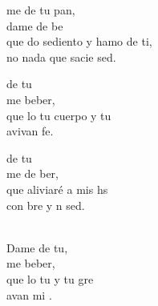 \begin{cancion}%
	me de tu pan,\\
	dame de be\\
	que do sediento y hamo de ti,\\
	no  nada que sacie  sed.\jump\\
	\begin{chorus}%
		de tu \\
		me  beber,\\
		que lo tu cuerpo y tu   \\
		avivan  fe.\jump\\
	\end{chorus}%
	de tu \\
	me de ber,\\
	que  aliviaré a mis hs\\
	con bre y n sed.\\
	\jumjump\\
	\begin{chorus}%
		Dame de tu\chord{fa}{m}{ pan},\\
		me  beber,\\
		que lo tu  y tu gre\\
		avan mi .\jump\\
	\end{chorus}%
	\jump
	\jump
	\jump
\end{cancion}%
